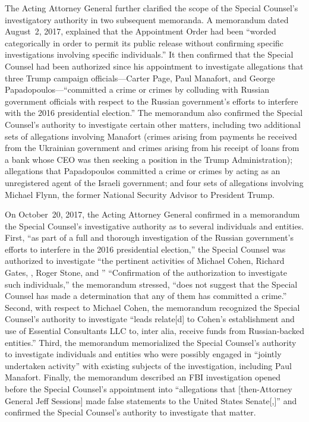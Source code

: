 The Acting Attorney General further clarified the scope of the Special Counsel's investigatory authority in two subsequent memoranda.
A memorandum dated August~2, 2017, explained that the Appointment Order had been ``worded categorically in order to permit its public release without confirming specific investigations involving specific individuals.''
It then confirmed that the Special Counsel had been authorized since his appointment to investigate allegations that three Trump campaign officials---Carter Page, Paul Manafort, and George Papadopoulos---``committed a crime or crimes by colluding with Russian government officials with respect to the Russian government's efforts to interfere with the 2016 presidential election.''
The memorandum also confirmed the Special Counsel's authority to investigate certain other matters, including two additional sets of allegations involving Manafort (crimes arising from payments he received from the Ukrainian government and crimes arising from his receipt of loans from a bank whose CEO was then seeking a position in the Trump Administration); allegations that Papadopoulos committed a crime or crimes by acting as an unregistered agent of the Israeli government; and four sets of allegations involving Michael Flynn, the former National Security Advisor to President Trump.

On October~20, 2017, the Acting Attorney General confirmed in a memorandum the Special Counsel's investigative authority as to several individuals and entities.
First, ``as part of a full and thorough investigation of the Russian government's efforts to interfere in the 2016 presidential election,'' the Special Counsel was authorized to investigate ``the pertinent activities of Michael Cohen, Richard Gates, , Roger Stone, and '' ``Confirmation of the authorization to investigate such individuals,'' the memorandum stressed, ``does not suggest that the Special Counsel has made a determination that any of them has committed a crime.''
Second, with respect to Michael Cohen, the memorandum recognized the Special Counsel's authority to investigate ``leads relate[d] to Cohen's establishment and use of Essential Consultants LLC to, inter alia, receive funds from Russian-backed entities.''
Third, the memorandum memorialized the Special Counsel's authority to investigate individuals and entities who were possibly engaged in ``jointly undertaken activity'' with existing subjects of the investigation, including Paul Manafort.
Finally, the memorandum described an FBI investigation opened before the Special Counsel's appointment into ``allegations that [then-Attorney General Jeff Sessions] made false statements to the United States Senate[,]'' and confirmed the Special Counsel's authority to investigate that matter.

